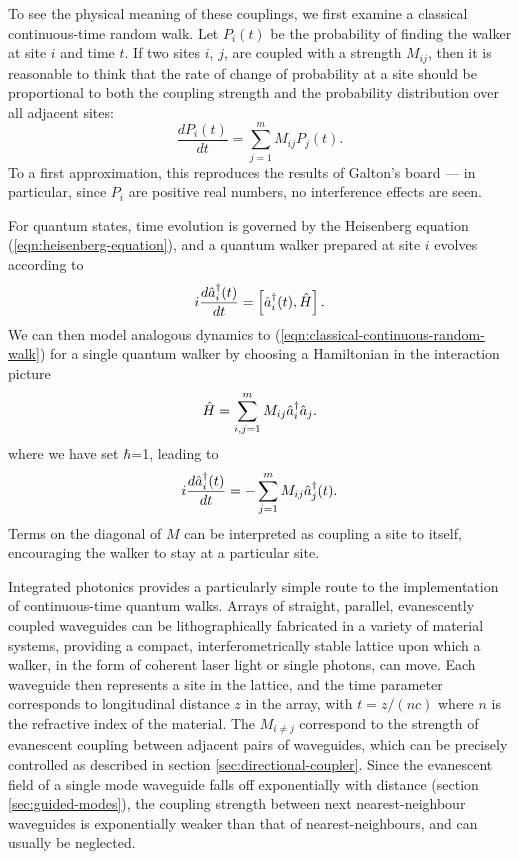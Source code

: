 To see the physical meaning of these couplings, we first examine a classical continuous-time random walk. Let $P_i(t)$ be the probability of finding the walker at site $i$ and time $t$. If two sites $i$, $j$, are coupled with a strength $M_{ij}$, then it is reasonable to think that the rate of change of probability at a site should be proportional to both the coupling strength and the probability distribution over all adjacent sites:
\begin{equation}
   \frac{d P_i(t)}{dt} = \sum_{j=1}^m M_{ij} P_j(t).
   \label{eqn:classical-continuous-random-walk}
\end{equation}
To a first approximation, this reproduces the results of Galton's board --- in particular, since $P_i$ are positive real numbers, no interference effects are seen.  

For quantum states, time evolution is governed by the Heisenberg equation (\ref{eqn:heisenberg-equation}), and a quantum walker prepared at site $i$ evolves according to
\begin{equation}
   i\frac{d\hat{a}^{\dagger}_i(t)}{dt} = \left[ \hat{a}^{\dagger}_i(t), \hat{H} \right].
\end{equation}
We can then model analogous dynamics to (\ref{eqn:classical-continuous-random-walk}) for a single quantum walker by choosing a Hamiltonian in the interaction picture
\begin{equation}
   \hat{H} = \sum_{i,j=1}^m M_{ij} \hat{a}^{\dagger}_i \hat{a}_j.
\end{equation}
where we have set $\hbar$=1, leading to
\begin{equation}
   i \frac{d \hat{a}^{\dagger}_i(t)}{dt} = - \sum_{j=1}^m M_{ij}\hat{a}^{\dagger}_j(t).
\end{equation}
Terms on the diagonal of $M$ can be interpreted as coupling a site to itself, encouraging the walker to stay at a particular site.

Integrated photonics provides a particularly simple route to the implementation of continuous-time quantum walks. Arrays of straight, parallel, evanescently coupled waveguides can be lithographically fabricated in a variety of material systems, providing a compact, interferometrically stable lattice upon which a walker, in the form of coherent laser light or single photons, can move. Each waveguide then represents a site in the lattice, and the time parameter corresponds to longitudinal distance $z$ in the array, with $t=z/(n c)$ where $n$ is the refractive index of the material. The $M_{i\ne j}$ correspond to the strength of evanescent coupling between adjacent pairs of waveguides, which can be precisely controlled as described in section \ref{sec:directional-coupler}. Since the evanescent field of a single mode waveguide falls off exponentially with distance (section \ref{sec:guided-modes}), the coupling strength between next nearest-neighbour waveguides is exponentially weaker than that of nearest-neighbours, and can usually be neglected.  

